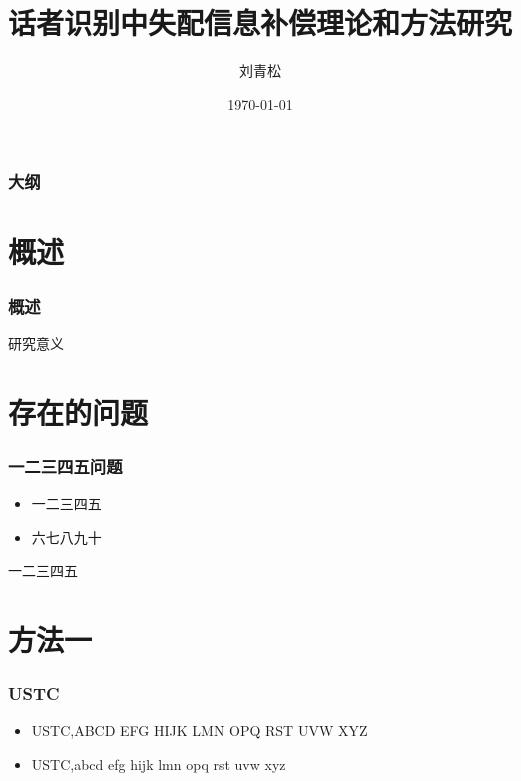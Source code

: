 ﻿\documentclass[12pt]{beamer}	%
\title{话者识别中失配信息补偿理论和方法研究}	%
\author[刘青松]{刘青松}
\institute[中国科学技术大学]{
语音信号与信息处理实验室\\
中国科学技术大学，电子科学与技术系
}	%
\date{\today}
\begin{document}
\begin{frame}
\titlepage
\end{frame}


\begin{frame}
\frametitle{大纲}
\tableofcontents
\end{frame}


\section{概述}
\begin{frame}
\frametitle{概述}
研究意义
\end{frame}


\section{存在的问题}

\begin{frame}
\frametitle{一二三四五问题}
\begin{itemize}
\item 一二三四五
\item \alert{六七八九十}
\end{itemize}
\pause
一二三四五

\end{frame}


\section{方法一}

\begin{frame}
\frametitle{USTC}

\begin{itemize}
\item<1-> USTC,ABCD EFG HIJK LMN OPQ RST UVW XYZ
\item<2-> USTC,abcd efg hijk lmn opq rst uvw xyz
\end{itemize}


\end{frame}
\end{document}

